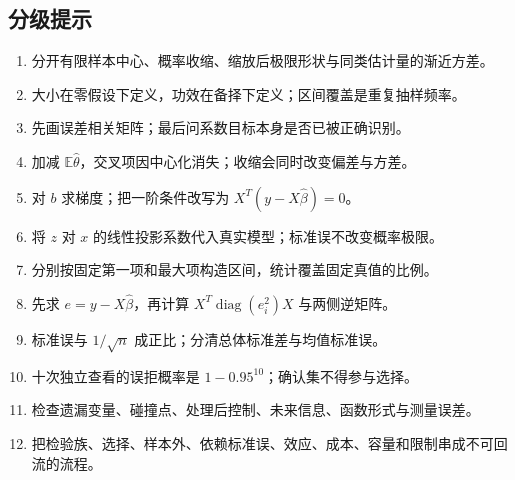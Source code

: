 \subsection*{分级提示}
\begingroup\small
\begin{enumerate}[leftmargin=*]
  \item 分开有限样本中心、概率收缩、缩放后极限形状与同类估计量的渐近方差。
  \item 大小在零假设下定义，功效在备择下定义；区间覆盖是重复抽样频率。
  \item 先画误差相关矩阵；最后问系数目标本身是否已被正确识别。
  \item 加减 $\mathbb E\hat\theta$，交叉项因中心化消失；收缩会同时改变偏差与方差。
  \item 对 $b$ 求梯度；把一阶条件改写为 $X^T(y-X\hat\beta)=0$。
  \item 将 $z$ 对 $x$ 的线性投影系数代入真实模型；标准误不改变概率极限。
  \item 分别按固定第一项和最大项构造区间，统计覆盖固定真值的比例。
  \item 先求 $e=y-X\hat\beta$，再计算 $X^T\operatorname{diag}(e_i^2)X$ 与两侧逆矩阵。
  \item 标准误与 $1/\sqrt n$ 成正比；分清总体标准差与均值标准误。
  \item 十次独立查看的误拒概率是 $1-0.95^{10}$；确认集不得参与选择。
  \item 检查遗漏变量、碰撞点、处理后控制、未来信息、函数形式与测量误差。
  \item 把检验族、选择、样本外、依赖标准误、效应、成本、容量和限制串成不可回流的流程。
\end{enumerate}
\endgroup
